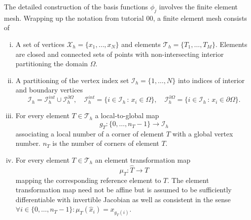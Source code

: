 \documentclass[a4paper,12pt]{article}
\begin{document}
The detailed construction of the basis functions $\phi_j$ involves the finite element mesh.
Wrapping up the notation from tutorial 00, a finite element mesh consists of
\begin{enumerate}[i)]
\item A set of vertices $\mathcal{X}_h = \{x_1,\ldots,x_N\}$ and
elements $\mathcal{T}_h = \{T_1, \ldots, T_M\}$. Elements are closed and connected sets of points
with non-intersecting interior partitioning the domain $\Omega$.
\item A partitioning of the vertex index set $\mathcal{I}_h=\{1,\ldots,N\}$
into indices of interior and boundary vertices
\begin{equation*}
\mathcal{I}_h = \mathcal{I}_h^{int}\cup\mathcal{I}_h^{\partial\Omega},
\quad \mathcal{I}_h^{int} = \{i\in \mathcal{I}_h\,:\, x_i\in\Omega\},
\quad \mathcal{I}_h^{\partial\Omega} = \{i\in \mathcal{I}_h\,:\, x_i\in\partial\Omega\}.
\end{equation*}
\item For every element $T\in\mathcal{T}_h$ a local-to-global map 
$$g_T:\{0,\ldots,n_T-1\}\to\mathcal{I}_h$$ 
associating a local number of a corner of element $T$ with a global vertex number.
$n_T$ is the number of corners of element $T$.
\item For every element $T\in\mathcal{T}_h$ an element transformation map
$$\mu_T : \hat T \to T$$
mapping the corresponding reference element to $T$. The element transformation
map need not be affine but is assumed to be sufficiently differentiable with invertible
Jacobian as well as consistent in the sense 
$\forall i\in\{0,\ldots,n_T-1\} : \mu_T(\hat x_i) = x_{g_T(i)}$.
\end{enumerate}
\end{document}
